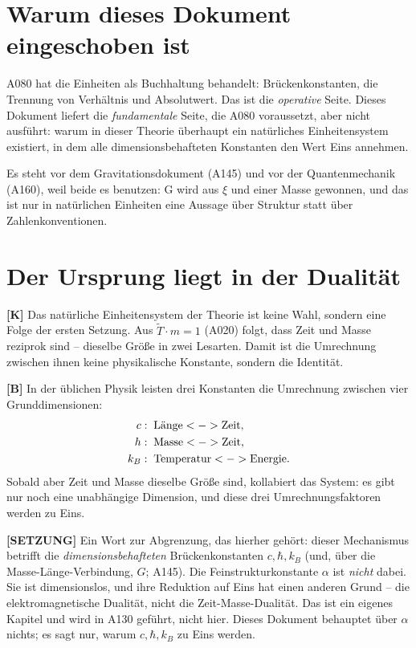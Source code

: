 \section{Warum dieses Dokument eingeschoben ist}

A080 hat die Einheiten als Buchhaltung behandelt: Brückenkonstanten, die
Trennung von Verhältnis und Absolutwert. Das ist die \emph{operative} Seite.
Dieses Dokument liefert die \emph{fundamentale} Seite, die A080 voraussetzt,
aber nicht ausführt: warum in dieser Theorie überhaupt ein natürliches
Einheitensystem existiert, in dem alle dimensionsbehafteten Konstanten den Wert
Eins annehmen.

Es steht vor dem Gravitationsdokument (A145) und vor der Quantenmechanik (A160),
weil beide es benutzen: G wird aus $\xi$ und einer Masse gewonnen, und das ist
nur in natürlichen Einheiten eine Aussage über Struktur statt über
Zahlenkonventionen.

\section{Der Ursprung liegt in der Dualität}

\textbf{[K]} Das natürliche Einheitensystem der Theorie ist keine Wahl, sondern
eine Folge der ersten Setzung. Aus $\tilde T\cdot m = 1$ (A020) folgt, dass
Zeit und Masse reziprok sind -- dieselbe Größe in zwei Lesarten. Damit ist die
Umrechnung zwischen ihnen keine physikalische Konstante, sondern die Identität.

\textbf{[B]} In der üblichen Physik leisten drei Konstanten die Umrechnung
zwischen vier Grunddimensionen:
\begin{align}
  c    &:\;\text{Länge}        \leftrightarrow\text{Zeit}, \notag\\
  \hbar&:\;\text{Masse}        \leftrightarrow\text{Zeit}, \notag\\
  k_B  &:\;\text{Temperatur}   \leftrightarrow\text{Energie}. \notag
\end{align}
Sobald aber Zeit und Masse dieselbe Größe sind, kollabiert das System: es gibt
nur noch eine unabhängige Dimension, und diese drei Umrechnungsfaktoren werden
zu Eins.

\textbf{[SETZUNG]} Ein Wort zur Abgrenzung, das hierher gehört: dieser
Mechanismus betrifft die \emph{dimensionsbehafteten} Brückenkonstanten
$c, \hbar, k_B$ (und, über die Masse-Länge-Verbindung, $G$; A145). Die
Feinstrukturkonstante $\alpha$ ist \emph{nicht} dabei. Sie ist dimensionslos,
und ihre Reduktion auf Eins hat einen anderen Grund -- die elektromagnetische
Dualität, nicht die Zeit-Masse-Dualität. Das ist ein eigenes Kapitel und wird in
A130 geführt, nicht hier. Dieses Dokument behauptet über $\alpha$ nichts; es
sagt nur, warum $c, \hbar, k_B$ zu Eins werden.

